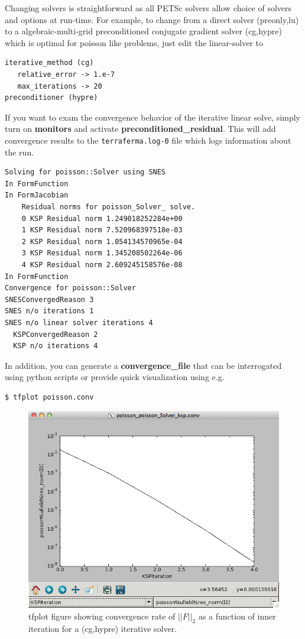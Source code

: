 Changing solvers is straightforward as all PETSc solvers
allow choice of solvers and options at run-time.  For example, to
change from a direct solver (preonly,lu) to a algebraic-multi-grid
preconditioned conjugate gradient solver (cg,hypre) which is optimal
for poisson like problems, just edit the linear-solver to
\begin{lstlisting}[style=Bash]
iterative_method (cg)
   relative_error -> 1.e-7
   max_iterations -> 20
preconditioner (hypre)
\end{lstlisting}
If you want to exam the convergence behavior of the iterative linear
solve, simply turn on \textbf{monitors} and activate
\textbf{preconditioned\_residual}.  This will add convergence results
to the \texttt{terraferma.log-0} file which logs information about the run.
\begin{lstlisting}[style=Bash]
Solving for poisson::Solver using SNES
In FormFunction
In FormJacobian
    Residual norms for poisson_Solver_ solve.
    0 KSP Residual norm 1.249018252284e+00 
    1 KSP Residual norm 7.520968397518e-03 
    2 KSP Residual norm 1.054134570965e-04 
    3 KSP Residual norm 1.345208502264e-06 
    4 KSP Residual norm 2.609245158576e-08 
In FormFunction
Convergence for poisson::Solver
SNESConvergedReason 3
SNES n/o iterations 1
SNES n/o linear solver iterations 4
  KSPConvergedReason 2
  KSP n/o iterations 4
\end{lstlisting}
In addition, you can generate a \textbf{convergence\_file} that can be
interrogated using python scripts or provide quick visualization using
e.g.
\begin{lstlisting}[style=Bash]
$ tfplot poisson.conv
\end{lstlisting} %
\begin{figure}[b!]
  \centering
  \includegraphics[width=.7\textwidth]{figures/screendumps/tfplot_cg-hypre-residuals.png}
  \caption{tfplot figure showing convergence rate of $||F||_2$ as a function of inner iteration for a (cg,hypre) iterative solver.}
  \label{fig:tfplot-convergence-poisson}
\end{figure}

